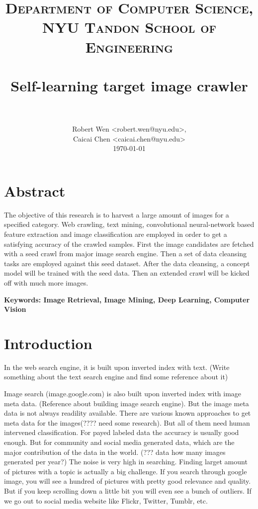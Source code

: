 \documentclass[paper=a4, fontsize=11pt]{scrartcl}
\title{
		\usefont{OT1}{bch}{b}{n}
		\normalfont \normalsize \textsc{Department of Computer Science, NYU Tandon School of Engineering} \\ [25pt]
		\horrule{0.5pt} \\[0.4cm]
		\huge Self-learning target image crawler \\
		\horrule{0.5pt} \\[0.5cm]
}
\author{
		\normalfont 								\normalsize
        Robert Wen <robert.wen@nyu.edu>,\\[-3pt]		\normalsize
        Caicai Chen <caicai.chen@nyu.edu>\\[-3pt]		\normalsize
        \today
}
\date{}
\numberwithin{equation}{section}		%
\numberwithin{figure}{section}			%
\numberwithin{table}{section}				%
\begin{document}
\maketitle

\setlength{\textwidth}{17.06cm}
\setlength{\columnsep}{0.75cm}
\begin{multicols}{2}


\section{Abstract}
The objective of this research is to harvest a large amount of images for a specified category. Web crawling, text mining, convolutional neural-network based feature extraction and image classification are employed in order to get a satisfying accuracy of the crawled samples. First the image candidates are fetched with a seed crawl from major image search engine. Then a set of data cleansing tasks are employed against this seed dataset. After the data cleansing, a concept model will be trained with the seed data. Then an extended crawl will be kicked off with much more images.

\noindent \textbf{Keywords: Image Retrieval, Image Mining, Deep Learning, Computer Vision}


\section{Introduction}

In the web search engine, it is built upon inverted index with text. (Write something about the text search engine and find some reference about it)

\noindent Image search (image.google.com) is also built upon inverted index with image meta data. (Reference about building image search engine). But the image meta data is not always readility available. There are various known approaches to get meta data for the images(???? need some research). But all of them need human intervened classification. For payed labeled data the accuracy is usually good enough. But for community and social media generated data, which are the major contribution of the data in the world. (??? data how many images generated per year?) The noise is very high in searching. Finding larget amount of pictures with a topic is actually a big challenge. If you search through google image, you will see a hundred of pictures with pretty good relevance and quality. But if you keep scrolling down a little bit you will even see a bunch of outliers. If we go out to social media website like Flickr, Twitter, Tumblr, etc. 


\end{multicols}
\end{document}
